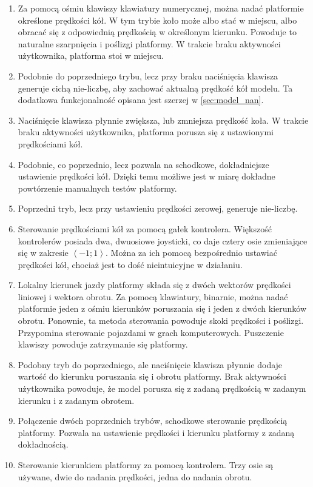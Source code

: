 		\begin{enumerate}
			\item Za pomocą ośmiu klawiszy klawiatury numerycznej, można nadać platformie określone prędkości kół.
			W tym trybie koło może albo stać w miejscu, albo obracać się z odpowiednią prędkością w określonym kierunku. 
			Powoduje to naturalne szarpnięcia i poślizgi platformy. W trakcie braku aktywności użytkownika, platforma stoi w miejscu.
			\item Podobnie do poprzedniego trybu, lecz przy braku naciśnięcia klawisza generuje cichą nie-liczbę, aby zachować aktualną prędkość kół modelu.
			Ta dodatkowa funkcjonalność opisana jest szerzej w \ref{sec:model_nan}.
			\item Naciśnięcie klawisza płynnie zwiększa, lub zmniejsza prędkość koła. W trakcie braku aktywności użytkownika, platforma porusza się 
			z ustawionymi prędkościami kół.
			\item Podobnie, co poprzednio, lecz pozwala na schodkowe, dokładniejsze ustawienie prędkości kół. 
			Dzięki temu możliwe jest w miarę dokładne powtórzenie manualnych testów platformy.
			\item Poprzedni tryb, lecz przy ustawieniu prędkości zerowej, generuje nie-liczbę.
			\item Sterowanie prędkościami kół za pomocą gałek kontrolera.
			Większość kontrolerów posiada dwa, dwuosiowe joysticki, co daje cztery osie zmieniające się w zakresie $\left<-1;1\right>$.
			Można za ich pomocą bezpośrednio ustawiać prędkości kół, chociaż jest to dość nieintuicyjne w działaniu.
			\item Lokalny kierunek jazdy platformy składa się z dwóch wektorów prędkości liniowej i wektora obrotu. 
			Za pomocą klawiatury, binarnie, można nadać platformie jeden z ośmiu kierunków poruszania się i jeden z dwóch kierunków obrotu.
			Ponownie, ta metoda sterowania powoduje skoki prędkości i poślizgi. Przypomina sterowanie pojazdami w grach komputerowych.
			Puszczenie klawiszy powoduje zatrzymanie się platformy.
			\item Podobny tryb do poprzedniego, ale naciśnięcie klawisza płynnie dodaje wartość do kierunku poruszania się i obrotu platformy.
			Brak aktywności użytkownika powoduje, że model porusza się z zadaną prędkością w zadanym kierunku i z zadanym obrotem.
			\item Połączenie dwóch poprzednich trybów, schodkowe sterowanie prędkością platformy. Pozwala na ustawienie prędkości i kierunku platformy z zadaną dokładnością.
			\item Sterowanie kierunkiem platformy za pomocą kontrolera. Trzy osie są używane, dwie do nadania prędkości, jedna do nadania obrotu.

\end{enumerate}
